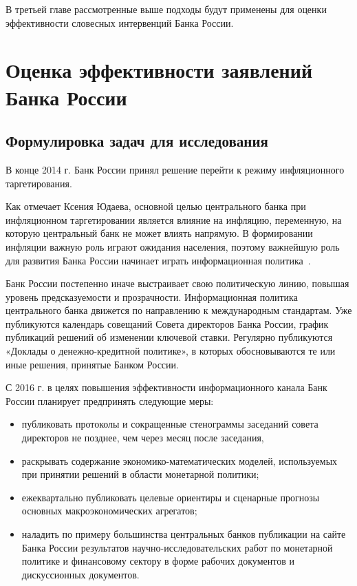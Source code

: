 \documentclass[14pt,a4paper, oneside]{extreport}
\begin{document}
В третьей главе рассмотренные выше подходы будут применены для оценки эффективности словесных интервенций Банка России.


\chapter{Оценка эффективности заявлений Банка России}

\section{Формулировка задач для исследования}

В конце 2014 г. Банк России принял решение перейти к режиму инфляционного таргетирования. 

Как отмечает Ксения Юдаева, основной целью центрального банка при инфляционном таргетировании является влияние на инфляцию, переменную, на которую центральный банк не может влиять напрямую. В формировании инфляции важную роль играют ожидания населения, поэтому важнейшую роль для развития Банка России начинает играть информационная политика~\cite{UDAEVA}. 

Банк России постепенно иначе выстраивает свою политическую линию, повышая уровень предсказуемости и прозрачности. Информационная политика центрального банка движется по направлению к международным стандартам. Уже публикуются календарь совещаний Совета директоров Банка России, график публикаций решений об изменении ключевой ставки. Регулярно публикуются «Доклады о денежно-кредитной политике», в которых обосновываются те или иные решения, принятые Банком России. 

С 2016 г. в целях повышения эффективности информационного канала Банк России планирует предпринять следующие меры:

\begin{itemize}
\item публиковать протоколы и сокращенные стенограммы заседаний совета директоров не позднее, чем через месяц после заседания,

\item раскрывать содержание экономико-математических моделей, используемых при принятии решений в области монетарной политики;

\item ежеквартально публиковать целевые ориентиры и сценарные прогнозы основных макроэкономических агрегатов;

\item наладить по примеру большинства центральных банков публикации на сайте Банка России результатов научно-исследовательских работ по монетарной политике и финансовому сектору в форме рабочих документов и дискуссионных документов.
\end{itemize}
\end{document}

